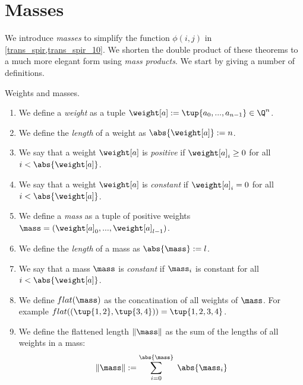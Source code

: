 \section{Masses}
We introduce \textit{masses} to simplify the function $\phi(i,j)$ in \cref{trans_spir,trans_spir_10}. We shorten the double product of these theorems to a much more elegant form using \textit{mass products}. We start by giving a number of definitions.

\begin{definition}{Weights and masses.}\hfill
	\begin{enumerate}
		\item We define a \textit{weight} as a tuple $\weight[a] := \tup{a_0,...,a_{n-1}}\in\Q^n$.
		\item We define the \textit{length} of a weight as $\abs{\weight[a]} := n$.
		\item We say that a weight $\weight[a]$ is \textit{positive} if $\weight[a]_i\geq0$ for all $i<\abs{\weight[a]}$.
		\item We say that a weight $\weight[a]$ is \textit{constant} if $\weight[a]_i = 0$ for all $i<\abs{\weight[a]}$. 
		\item We define a \textit{mass} as a tuple of positive weights $\mass = (\weight[a]_0,...,\weight[a]_{l-1})$.
		\item We define the \textit{length} of a mass as $\abs{\mass} := l$.
		\item We say that a mass $\mass$ is \textit{constant} if $\mass_i$ is constant for all $i<\abs{\weight[a]}$.
		\item We define $flat({\mass})$ as the concatination of all weights of $\mass$. For example $flat((\tup{1,2},\tup{3,4})) = \tup{1,2,3,4}$.
		\item We define the flattened length $\|\mass\|$ as the sum of the lengths of all weights in a mass: $$\|\mass\| := \sum_{i=0}^{\abs{\mass}}\;\abs{\mass_i}$$
	\end{enumerate}
\end{definition}

